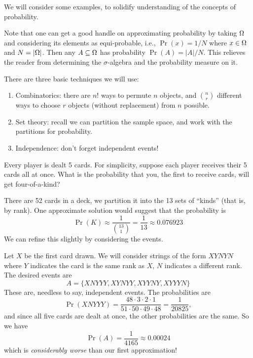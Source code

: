 We will consider some examples, to solidify understanding of the
concepts of probability.

Note that one can get a good handle on approximating probability by
taking $\Omega$ and considering its elements as
equi-probable, i.e., $\Pr(x)=1/N$ where $x\in\Omega$ and
$N=|\Omega|$. Then any $A\subseteq\Omega$ has probability
$\Pr(A)=|A|/N$. This relieves the reader from determining the
$\sigma$-algebra and the probability measure on it.

There are three basic techniques we will use:
\begin{enumerate}
\item Combinatorics: there are $n!$ ways to permute $n$ objects, and
  $\binom{n}{r}$ different ways to choose $r$ objects (without
  replacement) from $n$ possible.
\item Set theory: recall we can partition the sample space, and work
  with the partitions for probability.
\item Independence: don't forget independent events!
\end{enumerate}

Every player is dealt 5 cards. For simplicity, suppose each player
receives their 5 cards all at once. What is the probability that you,
the first to receive cards, will get four-of-a-kind?

There are 52 cards in a deck, we partition it into the 13 sets of
``kinds'' (that is, by rank). One approximate solution would suggest
that the probability is
\begin{equation}
\Pr(K)\approx\frac{1}{\binom{13}{1}}=\frac{1}{13}\approx0.076923
\end{equation}
We can refine this slightly by considering the events. 

Let $X$ be the first card drawn. We will consider strings of the form
$XYNYN$ where $Y$ indicates the card is the same rank as $X$, $N$
indicates a different rank. The desired events are
\begin{equation}
A=\{XNYYY,XYNYY,XYYNY,XYYYN\}
\end{equation}
These are, needless to say, independent events. The probabilities are
\begin{equation}
\Pr(XNYYY)=\frac{48\cdot3\cdot2\cdot1}{51\cdot50\cdot49\cdot48}=\frac{1}{20825},
\end{equation}
and since all five cards are dealt at once, the other probabilities are
the same. So we have
\begin{equation}
\Pr(A)=\frac{1}{4165}\approx0.00024
\end{equation}
which is \emph{considerably worse} than our first approximation!

